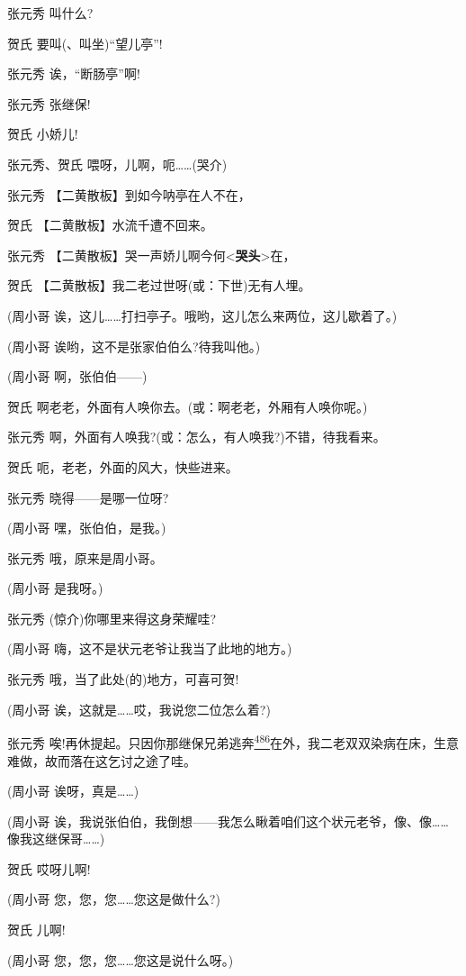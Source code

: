 张元秀 叫什么?

贺氏 要叫(、叫坐)``望儿亭''!

张元秀 诶，``断肠亭''啊!

张元秀 张继保!

贺氏 小娇儿!

张元秀、贺氏 喂呀，儿啊，呃\ldots{}\ldots{}(哭介)

张元秀 【二黄散板】到如今呐亭在人不在，

贺氏 【二黄散板】水流千遭不回来。

张元秀
【二黄散板】哭一声娇儿啊今何\textless{}\textbf{哭头}\textgreater{}在，

贺氏 【二黄散板】我二老过世呀(或：下世)无有人埋。

(周小哥
诶，这儿\ldots{}\ldots{}打扫亭子。哦哟，这儿怎么来两位，这儿歇着了。)

(周小哥 诶哟，这不是张家伯伯么?待我叫他。)

(周小哥 啊，张伯伯------)

贺氏 啊老老，外面有人唤你去。(或：啊老老，外厢有人唤你呢。)

张元秀 啊，外面有人唤我?(或：怎么，有人唤我?)不错，待我看来。

贺氏 呃，老老，外面的风大，快些进来。

张元秀 晓得------是哪一位呀?

(周小哥 嘿，张伯伯，是我。)

张元秀 哦，原来是周小哥。

(周小哥 是我呀。)

张元秀 (惊介)你哪里来得这身荣耀哇?

(周小哥 嗨，这不是状元老爷让我当了此地的地方。)

张元秀 哦，当了此处(的)地方，可喜可贺!

(周小哥 诶，这就是\ldots{}\ldots{}哎，我说您二位怎么着?)

张元秀
唉!再休提起。只因你那继保兄弟逃奔\protect\hyperlink{fn486}{\textsuperscript{486}}在外，我二老双双染病在床，生意难做，故而落在这乞讨之途了哇。

(周小哥 诶呀，真是\ldots{}\ldots{})

(周小哥
诶，我说张伯伯，我倒想------我怎么瞅着咱们这个状元老爷，像、像\ldots{}\ldots{}像我这继保哥\ldots{}\ldots{})

贺氏 哎呀儿啊!

(周小哥 您，您，您\ldots{}\ldots{}您这是做什么?)

贺氏 儿啊!

(周小哥 您，您，您\ldots{}\ldots{}您这是说什么呀。)

